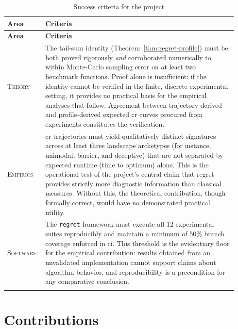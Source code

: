 \begin{longtable}{@{}p{0.15\linewidth}p{0.79\linewidth}@{}}

  \toprule
  \textbf{Area} & \textbf{Criteria} \\
  \midrule
  \endfirsthead

  \toprule
  \textbf{Area} & \textbf{Criteria} \\
  \midrule
  \endhead


  \textsc{Theory} &
  The tail-sum identity (Theorem~\ref{thm:regret-profile}) must be both
  proved rigorously \textit{and} corroborated numerically to within
  Monte-Carlo sampling error on at least two benchmark functions. Proof
  alone is insufficient: if the identity cannot be verified in the
  finite, discrete experimental setting, it provides no practical basis
  for the empirical analyses that follow. Agreement between
  trajectory-derived and profile-derived expected \acrfull{cr}
  curves procured from experiments constitutes the verification. \\
  \hline

  \textsc{Empirics} &
  \acrfull{cr} trajectories must yield qualitatively distinct
  signatures across at least three landscape archetypes (for instance,
  unimodal, barrier, and deceptive) that are not separated by
  expected runtime (time to optimum) alone. This is the
  operational test of the project's central claim that regret provides
  strictly more diagnostic information than classical measures. Without
  this, the theoretical contribution, though formally correct, would
  have no demonstrated practical utility.\\
  \hline

  \textsc{Software} &
  The \texttt{regret} framework must execute all 12 experimental suites
  reproducibly and maintain a minimum of 50\% branch coverage enforced
  in \acrshort{ci}. This threshold is the evidentiary floor for the
  empirical contribution: results obtained from an unvalidated
  implementation cannot support claims about algorithm behavior, and
  reproducibility is a precondition for any comparative conclusion.\\
  \hline

  \caption{Success criteria for the project}
  \label{tab:succrit}

\end{longtable}

\section{Contributions}
\label{sec:intro:contributions}

